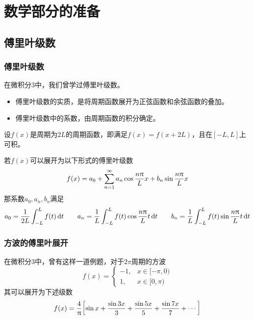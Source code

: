 \section{数学部分的准备}

\subsection{傅里叶级数}

\begin{frame}
    \frametitle{傅里叶级数}
    在微积分3中，我们曾学过傅里叶级数。
    \begin{itemize}
        \item 傅里叶级数的实质，是将周期函数展开为正弦函数和余弦函数的叠加。
        \item 傅里叶级数中的系数，由周期函数的积分确定。
    \end{itemize}
\end{frame}

\begin{frame}
    \begin{theorem}[傅里叶级数]
        设$f(x)$是周期为$2L$的周期函数，即满足$f(x)=f(x+2L)$，且在$[-L,L]$上可积。

        若$f(x)$可以展开为以下形式的傅里叶级数
        \begin{equation}
            f(x)=a_0+\Sum[n=1][\infty]{a_n\cos\frac{n\pi}{L}x+b_n\sin\frac{n\pi}{L}x}
        \end{equation}
        那系数$a_0,a_n,b_n$满足
        \begin{gather}
            a_0=\frac{1}{2L}\Int[-L][L]{f(t)\dd{t}}\qquad
            a_n=\frac{1}{L}\Int[-L][L]{f(t)\cos\frac{n\pi}{L}t\dd{t}}\qquad
            b_n=\frac{1}{L}\Int[-L][L]{f(t)\sin\frac{n\pi}{L}t\dd{t}}
        \end{gather}
    \end{theorem}  
\end{frame}

\begin{frame}
    \frametitle{方波的傅里叶展开}
    在微积分3中，曾有这样一道例题，对于$2\pi$周期的方波
    \begin{equation}
        f(x)=
        \begin{cases}
            -1,&x\in[-\pi,0)\\
            1,&x\in[0,\pi)
        \end{cases}
    \end{equation}
    其可以展开为下述级数
    \begin{equation}
        f(x)=\frac{4}{\uppi}\qty[\sin x+\frac{\sin 3x}{3}+\frac{\sin 5x}{5}+\frac{\sin 7x}{7}+\cdots]
    \end{equation}
\end{frame}

